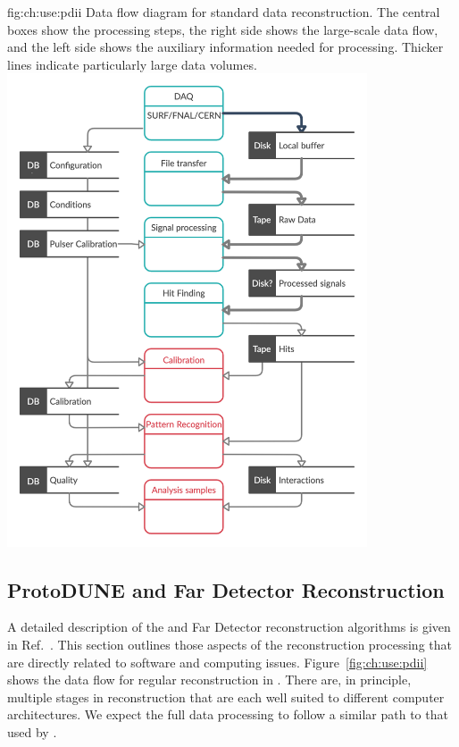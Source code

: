 \documentclass[../main-v1.tex]{subfiles}
\begin{document}
\begin{dunefigure}
{fig:ch:use:pdii}
{Data flow diagram for standard  data reconstruction. The central boxes show the processing steps, the right side shows the large-scale data flow,  and the left side shows the auxiliary information needed for processing. Thicker lines indicate particularly large data volumes.}
\includegraphics[width=0.8\textwidth]{graphics/IntroFigures/Data_processing_FD_v3.png}
\end{dunefigure}

\subsection{ProtoDUNE and Far Detector Reconstruction}\label{sec:use:pdii}

A detailed description of the  and Far Detector reconstruction algorithms is given in Ref.~\cite{DUNE:2020ypp}.  This section outlines those aspects of the reconstruction processing that are directly related to software and computing issues.
Figure~\ref{fig:ch:use:pdii} shows the data flow for regular reconstruction in .  
There are, in principle,  multiple stages in reconstruction that are each well suited to different computer architectures.  We expect the full  data processing to follow a similar path to that used by .  
\end{document}
